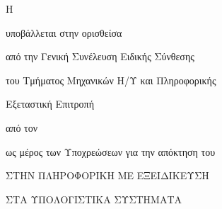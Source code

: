 \thispagestyle{empty}
\makeatletter
{\LARGE \@title}
\par
\vspace{2.5cm} {\Large Η \csethesisTypeEl}

\vspace{1.25cm} {\Large υποβάλλεται στην ορισθείσα}

\vspace{0.75cm} {\Large από την Γενική Συνέλευση Ειδικής Σύνθεσης}

\vspace{0.25cm} {\Large του Τμήματος Μηχανικών Η/Υ και Πληροφορικής}

\vspace{0.25cm} {\Large Εξεταστική Επιτροπή}

\vspace{1.25cm} {\Large από τον} %

\vspace{1.75cm} {\LARGE \@author}

\vspace{1.25cm} {\Large ως μέρος των Υποχρεώσεων για την απόκτηση του}

\vspace{1.75cm} {\Large \csediplwmaEl}

\vspace{0.5cm} {\Large ΣΤΗΝ ΠΛΗΡΟΦΟΡΙΚΗ
 ΜΕ ΕΞΕΙΔΙΚΕΥΣΗ} %

\vspace{0.5cm} {\Large ΣΤΑ ΥΠΟΛΟΓΙΣΤΙΚΑ ΣΥΣΤΗΜΑΤΑ} %
\par
\vfill {\Large \@date}
\clearpage
